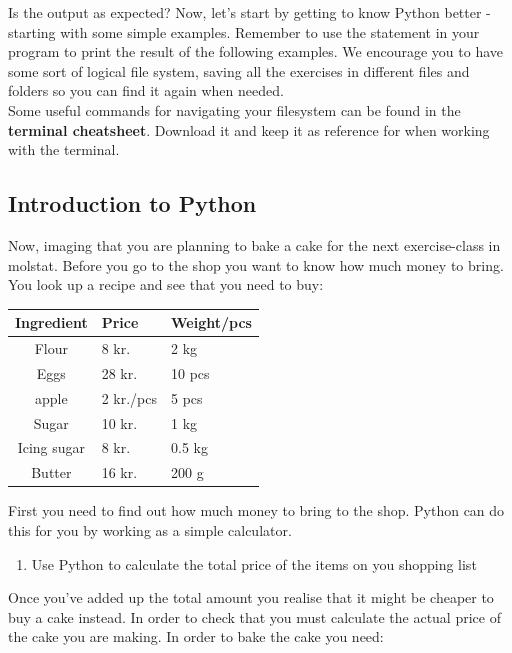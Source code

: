 \documentclass{article}
\begin{document}
Is the output as expected?
%
Now, let's start by getting to know Python better - starting with some simple examples. Remember to use the  statement in your program to print the result of the following examples.
We encourage you to have some sort of logical file system, saving all the exercises in different files and folders so you can find it again when needed. \\

Some useful commands for navigating your filesystem can be found in the \textbf{terminal cheatsheet}.
Download it and keep it as reference for when working with the terminal.\\

\subsection{Introduction to Python}

Now, imaging that you are planning to bake a cake for the next exercise-class in molstat.
Before you go to the shop you want to know how much money  to bring.
You look up a recipe and see that you need to buy:

\vspace{10pt }
 
\begin{center}
    \begin{tabular}{c l l}
    \hline
    Ingredient & Price & Weight/pcs \\
    \hline
    Flour & 8 kr. & 2 kg \\
    Eggs & 28 kr. & 10 pcs \\
    apple & 2 kr./pcs & 5 pcs \\
    Sugar & 10 kr. & 1 kg \\
    Icing sugar &  8 kr. & 0.5 kg \\
    Butter & 16 kr. & 200 g \\
    \end{tabular}
\end{center}

First you need to find out how much money to bring to the shop.
Python can do this for you by working as a simple calculator.

\begin{enumerate}
    \item Use Python  to calculate the total price of the items on you shopping list  
\end{enumerate}

Once you've added up the total amount you realise that it might be cheaper to buy a cake instead.
In order to check that you must calculate the actual price of the cake you are making.
In order to bake the cake you need:
\end{document}
